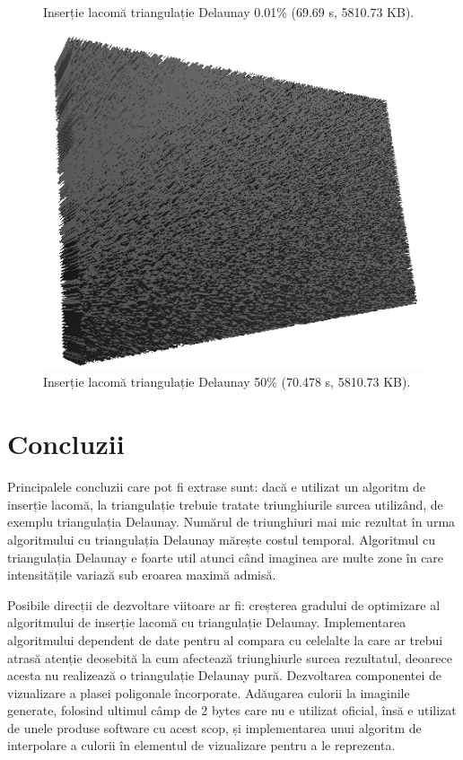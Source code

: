 \documentclass[12pt]{article}
\begin{document}
\begin{figure}[!htb]
\begin{minipage}{0.24\textwidth}
		\caption{Inserție lacomă triangulație Delaunay 0.01\% (69.69 s, 5810.73 KB).}\label{fig:fig31}
	\end{minipage}\hfill
        \begin{minipage}{0.24\textwidth}
		\centering
		\includegraphics[width=.95\linewidth]{Sah/SahDelaunay50.png}
		\caption{Inserție lacomă triangulație Delaunay 50\% (70.478 s, 5810.73 KB).}\label{fig:fig32}
	\end{minipage}\hfill
\end{figure}

\newpage
\section{Concluzii}

Principalele concluzii care pot fi extrase sunt: dacă e utilizat un algoritm de inserție lacomă, la triangulație trebuie tratate triunghiurile surcea utilizând, de exemplu triangulația Delaunay. Numărul de triunghiuri mai mic rezultat în urma algoritmului cu triangulația Delaunay mărește costul temporal. Algoritmul cu triangulația Delaunay e foarte util atunci când imaginea are multe zone în care intensitățile variază sub eroarea maximă admisă.

Posibile direcții de dezvoltare viitoare ar fi: creșterea gradului de optimizare al algoritmului de inserție lacomă cu triangulație Delaunay. Implementarea algoritmului dependent de date pentru al compara cu celelalte la care ar trebui atrasă atenție deosebită la cum afectează triunghiurle surcea rezultatul, deoarece acesta nu realizează o triangulație Delaunay pură. Dezvoltarea componentei de vizualizare a plasei poligonale încorporate. Adăugarea culorii la imaginile generate, folosind ultimul câmp de 2 bytes care nu e utilizat oficial, însă e utilizat de unele produse software cu acest scop, și implementarea unui algoritm de interpolare a culorii în elementul de vizualizare pentru a le reprezenta.
\end{document}
